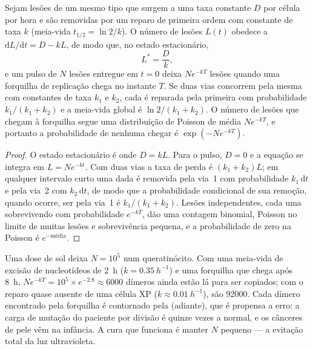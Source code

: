 \begin{theorem}\label{thm:b3:dna-repair:load}
Sejam lesões de um mesmo tipo que surgem a uma taxa constante $D$ por
célula por hora e são removidas por um reparo de primeira ordem com
constante de taxa $k$ (meia-vida $t_{1/2} = \ln 2/k$). O número de
lesões $L(t)$ obedece a $\mathrm{d}L/\mathrm{d}t = D - kL$, de modo
que, no estado estacionário,
\[
L^{*} = \frac{D}{k},
\]
e um pulso de $N$ lesões entregue em $t = 0$ deixa $N e^{-kT}$ lesões
quando uma forquilha de replicação chega no instante $T$. Se duas vias
concorrem pela mesma  com constantes de taxa $k_{1}$ e $k_{2}$,
cada  é reparada pela primeira com probabilidade
$k_{1}/(k_{1} +
k_{2})$ e a meia-vida global é $\ln 2/(k_{1} + k_{2})$.
O número de lesões que chegam à forquilha segue uma distribuição de
Poisson de média $N e^{-kT}$, e portanto a probabilidade de nenhuma
chegar é $\exp(-N e^{-kT})$.
\end{theorem}
\begin{proof}
O estado estacionário é onde $D = kL$. Para o pulso, $D = 0$ e a
equação se integra em $L = N e^{-kt}$. Com duas vias a taxa de perda é
$(k_{1} + k_{2})L$; em qualquer intervalo curto uma dada  é
removida pela via~1 com probabilidade $k_{1}\,\mathrm{d}t$ e pela
via~2 com $k_{2}\,\mathrm{d}t$, de modo que a probabilidade
condicional de sua remoção, quando ocorre, ser pela via~1 é
$k_{1}/(k_{1} +
k_{2})$. Lesões independentes, cada uma sobrevivendo
com probabilidade $e^{-kT}$, dão uma contagem binomial, Poisson no
limite de muitas lesões e sobrevivência pequena, e a probabilidade de
zero na Poisson é $e^{-\text{média}}$.
\end{proof}

\begin{example}\label{ex:b3:dna-repair:xp}
Uma dose de sol deixa $N = 10^{5}$  num
queratinócito. Com uma meia-vida de excisão de nucleotídeos de
\qty{2}{h} ($k =
\qty{0.35}{h^{-1}}$) e uma forquilha que chega após
\qty{8}{h}, $N e^{-kT} =
10^{5}\times e^{-2.8} \approx 6000$ dímeros
ainda estão lá para ser copiados; com o reparo quase ausente de uma
célula XP ($k \approx
\qty{0.01}{h^{-1}}$), são \num{92000}. Cada
dímero encontrado pela forquilha é contornado pela 
(adiante), que é propensa a erro: a carga de mutação do paciente por
divisão é quinze vezes a normal, e os cânceres de pele vêm na
infância. A cura que funciona é manter $N$ pequeno --- a evitação
total da luz ultravioleta.
\end{example}

